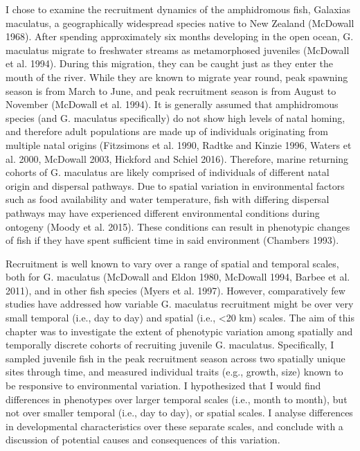 \documentclass[]{book}
\begin{document}
I chose to examine the recruitment dynamics of the amphidromous fish,
Galaxias maculatus, a geographically widespread species native to New
Zealand (McDowall 1968). After spending approximately six months
developing in the open ocean, G. maculatus migrate to freshwater streams
as metamorphosed juveniles (McDowall et al. 1994). During this
migration, they can be caught just as they enter the mouth of the river.
While they are known to migrate year round, peak spawning season is from
March to June, and peak recruitment season is from August to November
(McDowall et al. 1994). It is generally assumed that amphidromous
species (and G. maculatus specifically) do not show high levels of natal
homing, and therefore adult populations are made up of individuals
originating from multiple natal origins (Fitzsimons et al. 1990, Radtke
and Kinzie 1996, Waters et al. 2000, McDowall 2003, Hickford and Schiel
2016). Therefore, marine returning cohorts of G. maculatus are likely
comprised of individuals of different natal origin and dispersal
pathways. Due to spatial variation in environmental factors such as food
availability and water temperature, fish with differing dispersal
pathways may have experienced different environmental conditions during
ontogeny (Moody et al. 2015). These conditions can result in phenotypic
changes of fish if they have spent sufficient time in said environment
(Chambers 1993).

Recruitment is well known to vary over a range of spatial and temporal
scales, both for G. maculatus (McDowall and Eldon 1980, McDowall 1994,
Barbee et al. 2011), and in other fish species (Myers et al. 1997).
However, comparatively few studies have addressed how variable G.
maculatus recruitment might be over very small temporal (i.e., day to
day) and spatial (i.e., \textless{}20 km) scales. The aim of this
chapter was to investigate the extent of phenotypic variation among
spatially and temporally discrete cohorts of recruiting juvenile G.
maculatus. Specifically, I sampled juvenile fish in the peak recruitment
season across two spatially unique sites through time, and measured
individual traits (e.g., growth, size) known to be responsive to
environmental variation. I hypothesized that I would find differences in
phenotypes over larger temporal scales (i.e., month to month), but not
over smaller temporal (i.e., day to day), or spatial scales. I analyse
differences in developmental characteristics over these separate scales,
and conclude with a discussion of potential causes and consequences of
this variation.
\end{document}
